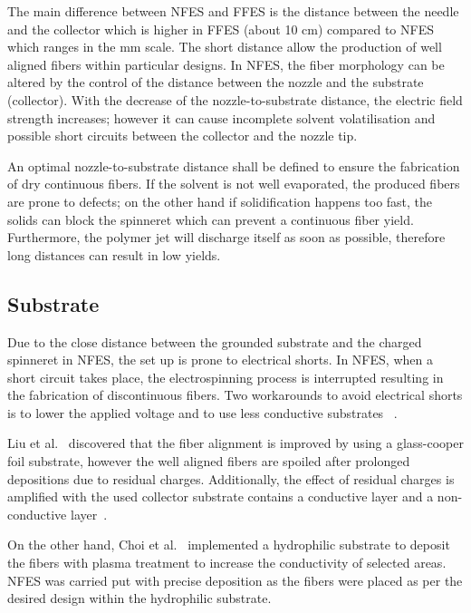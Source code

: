 The main difference between NFES and FFES is the distance between the needle and the collector which is higher in FFES (about 10 cm) compared to NFES which ranges in the mm scale. The short distance allow the production of well aligned fibers within particular designs. In NFES, the fiber morphology can be altered by the control of the distance between the nozzle and the substrate (collector). With the decrease of the nozzle-to-substrate distance, the electric field strength increases; however it can cause incomplete solvent volatilisation and possible short circuits between the collector and the nozzle tip.

An optimal nozzle-to-substrate distance shall be defined to ensure the fabrication of dry continuous fibers. If the solvent is not well evaporated, the produced fibers are prone to defects; on the other hand if solidification happens too fast, the solids can block the spinneret which can prevent a continuous fiber yield. Furthermore, the polymer jet will discharge itself as soon as possible, therefore long distances can result in low yields.



\subsection{Substrate}Due to the close distance between the grounded substrate and the charged spinneret in NFES, the set up is prone to electrical shorts. In NFES, when a short circuit takes place, the electrospinning process is interrupted resulting in the fabrication of discontinuous fibers. Two workarounds to avoid electrical shorts is to lower the applied voltage and to use less conductive substrates \unskip~\cite{527120:11974315,527120:12322289}.

Liu et al.\unskip~\cite{527120:11974315} discovered that the fiber alignment is improved by using a glass-cooper foil substrate, however the well aligned fibers are spoiled after prolonged depositions due to residual charges. Additionally, the effect of residual charges is amplified with the used collector substrate contains a conductive layer and a non-conductive layer\unskip~\cite{527120:11974315}.

On the other hand, Choi et al.\unskip~\cite{527120:12322289} implemented a hydrophilic substrate to deposit the fibers with plasma treatment to increase the conductivity of selected areas. NFES was carried put with precise deposition as the fibers were placed as per the desired design within the hydrophilic substrate.

